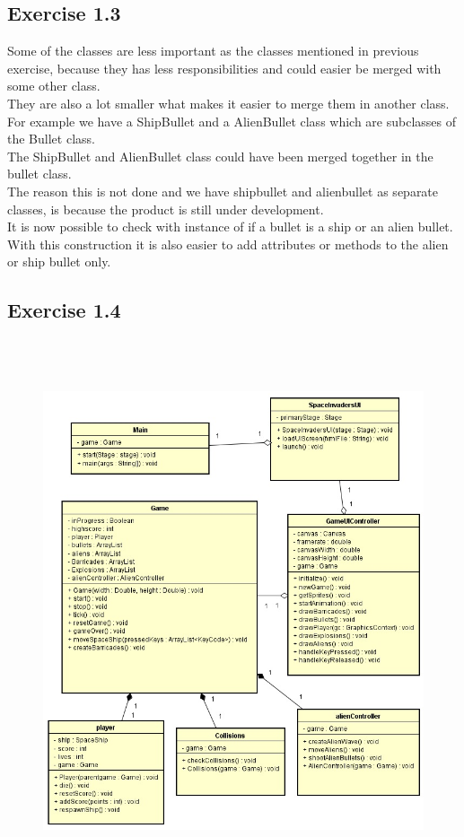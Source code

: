\documentclass[10pt]{article}
\begin{document}
 \subsection*{Exercise 1.3} 
Some of the classes are less important as the classes mentioned in previous exercise, because they has less responsibilities and could easier be merged with some other class.\\
They are also a lot smaller what makes it easier to merge them in another class. For example we have a ShipBullet and a AlienBullet class which are subclasses of the Bullet class. \\
 The ShipBullet and AlienBullet class could have been merged together in the bullet class. \\
The reason this is not done and we have shipbullet and alienbullet as separate classes, is because the product is still under development. \\
It is now possible to check with instance of if a bullet is a ship or an alien bullet. \\
With this construction it is also easier to add attributes or methods to the alien or ship bullet only.\\
 \pagebreak

 \subsection*{Exercise 1.4} 
\begin{figure}[ht!]
\centering
\includegraphics[width=14cm, height=16cm]{UMLSEM.jpg}
\end{figure}
\pagebreak
\end{document}
